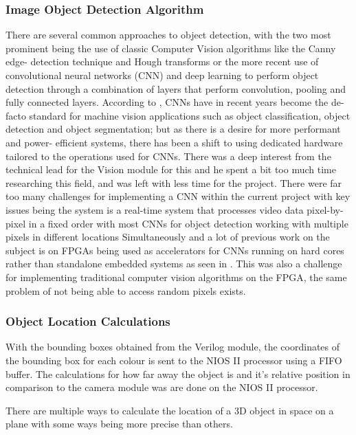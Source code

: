\documentclass[a4paper]{article}
\begin{document}
\subsubsection{Image Object Detection Algorithm}

There are several common approaches to object detection, with the two most 
prominent being the use of classic Computer Vision algorithms like the Canny edge-
detection technique and Hough transforms or the more recent use of convolutional
neural networks (CNN) and deep learning to perform object detection through a 
combination of layers that perform convolution, pooling and fully connected layers. 
According to \cite{DBLP:journals/corr/abs-1806-01683}, CNNs have in recent years 
become the de-facto standard for machine vision applications such as object 
classification, object detection and object segmentation; but as there is a desire 
for more performant and power- efficient systems, there has been a shift to 
using dedicated hardware tailored to the operations used for CNNs. There was a 
deep interest from the technical lead for the Vision module for this and he spent 
a bit too much time researching this field, and was left with less time for the 
project. There were far too many challenges for implementing a CNN within the 
current project with key issues being the system is a real-time system that 
processes video data pixel-by-pixel in a fixed order with most CNNs for object 
detection working with multiple pixels in different locations Simultaneously and
a lot of previous work on the subject is on FPGAs being used as accelerators for 
CNNs running on hard cores rather than standalone embedded systems as seen in \cite{DBLP:journals/corr/abs-1806-01683}
. This was also a challenge for implementing traditional computer vision 
algorithms on the FPGA,  the same problem of not being able to access random 
pixels exists. 


\subsubsection{Object Location Calculations}

With the bounding boxes obtained from the Verilog module, the coordinates of the
bounding box for each colour is sent to the NIOS II processor using a FIFO buffer.
The calculations for how far away the object is and it's relative position in 
comparison to the camera module was are done on the NIOS II processor. 

There are multiple ways to calculate the location of a 3D object in space on a plane
with some ways being more precise than others. 
\end{document}
